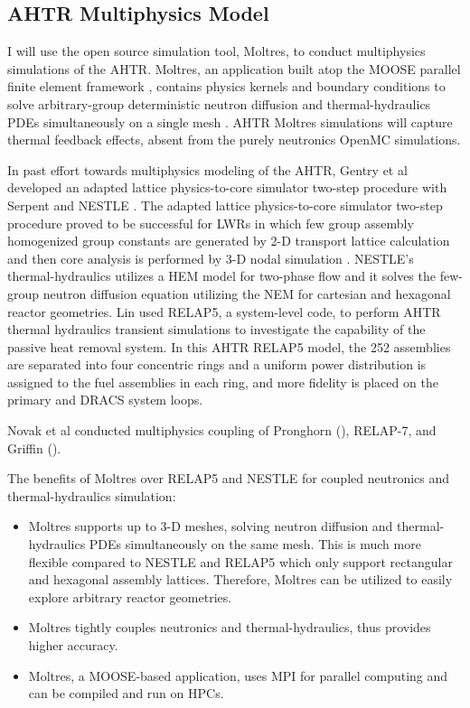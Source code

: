\subsection{\gls{AHTR} Multiphysics Model}
I will use the open source simulation tool, Moltres, to conduct multiphysics 
simulations of the \gls{AHTR}. 
Moltres, an application built atop the \gls{MOOSE} parallel finite element 
framework \cite{gaston_moose:_2009}, contains physics kernels and boundary 
conditions to solve arbitrary-group deterministic neutron diffusion and 
thermal-hydraulics \glspl{PDE} simultaneously on a single mesh
\cite{lindsay_introduction_2018,park_advancement_2020}. 
\gls{AHTR} Moltres simulations will capture thermal feedback effects, absent
from the purely neutronics OpenMC simulations.  

In past effort towards multiphysics modeling of the \gls{AHTR}, Gentry et al 
\cite{gentry_development_2016} developed an adapted lattice physics-to-core 
simulator two-step procedure with Serpent \cite{leppanen_serpent_2014} 
and \gls{NESTLE} \cite{turinsky_nestle_1994}. 
The adapted lattice physics-to-core simulator two-step procedure proved to be 
successful for \glspl{LWR} in which few group assembly homogenized group 
constants are generated by 2-D transport lattice calculation and then core 
analysis is performed by 3-D nodal simulation 
\cite{koebke_new_1980,gentry_development_2016}. 
\gls{NESTLE}'s thermal-hydraulics utilizes a \gls{HEM} model for two-phase 
flow and it solves the few-group neutron diffusion equation utilizing the
\gls{NEM} for cartesian and hexagonal reactor geometries.  
Lin \cite{lin_thermal_2020} used RELAP5, a system-level code, to perform 
\gls{AHTR} thermal hydraulics transient simulations to investigate the 
capability of the passive heat removal system. 
In this \gls{AHTR} RELAP5 model, the 252 assemblies are separated into four 
concentric rings and a uniform power distribution is assigned to the fuel 
assemblies in each ring, and more fidelity is placed on the primary and 
\gls{DRACS} system loops. 

Novak et al \cite{novak_pronghorn_2021} conducted multiphysics coupling of 
Pronghorn (), RELAP-7, and Griffin ().  

The benefits of Moltres over RELAP5 and NESTLE for coupled neutronics and 
thermal-hydraulics simulation: 
\begin{itemize}
  \item Moltres supports up to 3-D meshes, solving neutron diffusion and 
  thermal-hydraulics \glspl{PDE} simultaneously on the same mesh. This is much 
  more flexible compared to \gls{NESTLE} and RELAP5 which only support 
  rectangular and hexagonal assembly lattices. Therefore, Moltres can be utilized 
  to easily explore arbitrary reactor geometries.
  \item Moltres tightly couples neutronics and thermal-hydraulics, thus 
  provides higher accuracy. 
  \item Moltres, a \gls{MOOSE}-based application, uses MPI for parallel computing 
  and can be compiled and run on \glspl{HPC}. 
\end{itemize}

